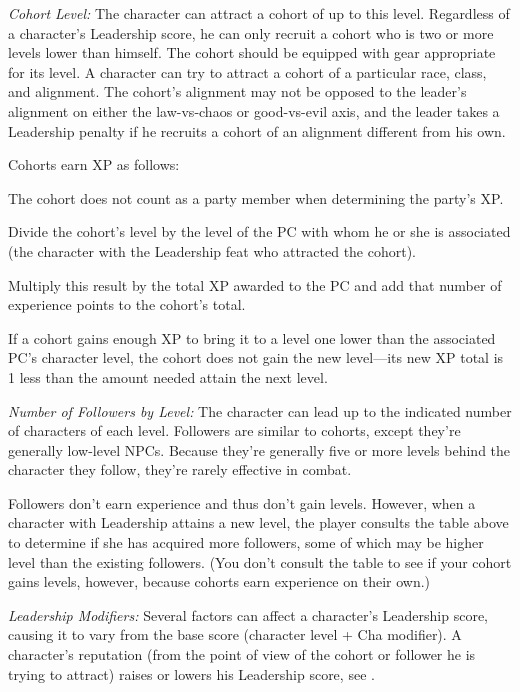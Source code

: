 {\textit{Cohort Level:} The character can attract a cohort of up to this level. Regardless of a character's Leadership score, he can only recruit a cohort who is two or more levels lower than himself. The cohort should be equipped with gear appropriate for its level. A character can try to attract a cohort of a particular race, class, and alignment. The cohort's alignment may not be opposed to the leader's alignment on either the law-vs-chaos or good-vs-evil axis, and the leader takes a Leadership penalty if he recruits a cohort of an alignment different from his own.

Cohorts earn XP as follows:

\begin{enumerate*}
\item The cohort does not count as a party member when determining the party's XP.
\item Divide the cohort's level by the level of the PC with whom he or she is associated (the character with the Leadership feat who attracted the cohort).
\item Multiply this result by the total XP awarded to the PC and add that number of experience points to the cohort's total.
\end{enumerate*}

If a cohort gains enough XP to bring it to a level one lower than the associated PC's character level, the cohort does not gain the new level---its new XP total is 1 less than the amount needed attain the next level.

\textit{Number of Followers by Level:} The character can lead up to the indicated number of characters of each level. Followers are similar to cohorts, except they're generally low-level NPCs. Because they're generally five or more levels behind the character they follow, they're rarely effective in combat.

Followers don't earn experience and thus don't gain levels. However, when a character with Leadership attains a new level, the player consults the table above to determine if she has acquired more followers, some of which may be higher level than the existing followers. (You don't consult the table to see if your cohort gains levels, however, because cohorts earn experience on their own.)

\textit{Leadership Modifiers:} Several factors can affect a character's Leadership score, causing it to vary from the base score (character level + Cha modifier). A character's reputation (from the point of view of the cohort or follower he is trying to attract) raises or lowers his Leadership score, see .

}

